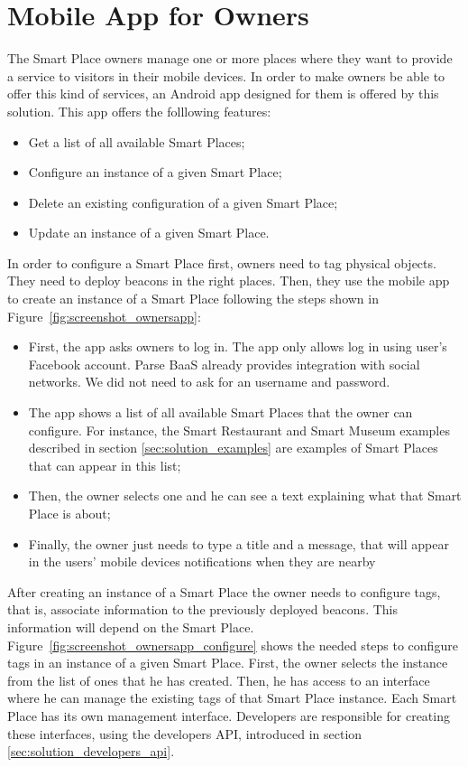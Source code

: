 \section{Mobile App for Owners}
\label{sec:solution_mobile_app_for_owners}
The Smart Place owners manage one or more places where they want to provide a service to visitors in their mobile devices.
In order to make owners be able to offer this kind of services, an Android app designed for them is offered by this solution.
This app offers the folllowing features:
\begin{itemize}
  \item Get a list of all available Smart Places;
  \item Configure an instance of a given Smart Place;
  \item Delete an existing configuration of a given Smart Place;
  \item Update an instance of a given Smart Place.
\end{itemize}

In order to configure a Smart Place first, owners need to tag physical objects.
They need to deploy beacons in the right places.
Then, they use the mobile app to create an instance of a Smart Place following the steps shown in Figure~\ref{fig:screenshot_ownersapp}:
\begin{itemize}
  \item First, the app asks owners to log in.
  The app only allows log in using user's Facebook account.
  Parse \gls{BaaS} already provides integration with social networks.
  We did not need to ask for an username and password.
  \item The app shows a list of all available Smart Places that the owner can configure.
  For instance, the Smart Restaurant and Smart Museum examples described in section \ref{sec:solution_examples} are examples of Smart Places that can appear in this list;
  \item Then, the owner selects one and he can see a text explaining what that Smart Place is about;
  \item Finally, the owner just needs to type a title and a message, that will appear in the users' mobile devices notifications when they are nearby
\end{itemize}

After creating an instance of a Smart Place the owner needs to configure tags, that is, associate information to the previously deployed beacons.
This information will depend on the Smart Place.
Figure~\ref{fig:screenshot_ownersapp_configure} shows the needed steps to configure tags in an instance of a given Smart Place.
First, the owner selects the instance from the list of ones that he has created.
Then, he has access to an interface where he can manage the existing tags of that Smart Place instance.
Each Smart Place has its own management interface.
Developers are responsible for creating these interfaces, using the developers \gls{API}, introduced in section \ref{sec:solution_developers_api}.

